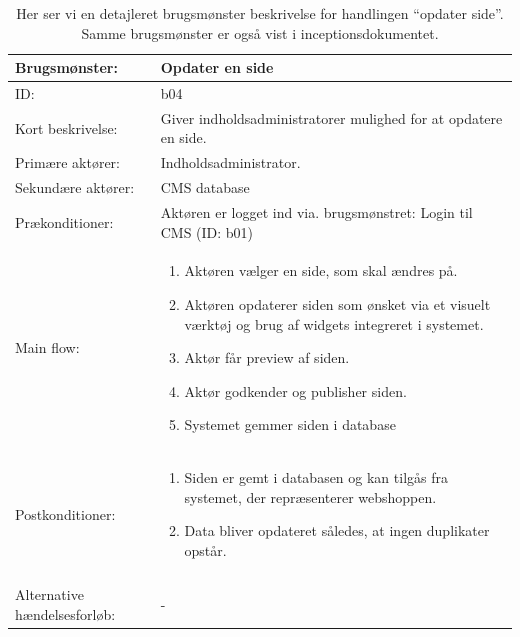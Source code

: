\begin{table}[H]
    \begin{tabular}{|p{5cm}|p{10cm}|}
        \hline
        Brugsmønster: & Opdater en side \\ 
        \hline
        ID: & b04 \\ 
        \hline
        Kort beskrivelse: & Giver indholdsadministratorer mulighed for at opdatere en side. \\ 
        \hline
        Primære aktører: & Indholdsadministrator. \\ 
        \hline
        Sekundære aktører: & CMS database \\ 
        \hline
        Prækonditioner: & Aktøren er logget ind via. brugsmønstret: Login til CMS (ID: b01) \\ 
        \hline
        Main flow: &    
        \begin{minipage}{10cm}
                \begin{enumerate}
                    \item Aktøren vælger en side, som skal ændres på.
                    \item Aktøren opdaterer siden som ønsket via et visuelt værktøj og brug af widgets integreret i systemet.
                    \item Aktør får preview af siden.
                    \item Aktør godkender og publisher siden.
                    \item Systemet gemmer siden i database
        \end{enumerate}
        \end{minipage} \par \\

        \hline
        Postkonditioner: & 
        	\begin{minipage}{10cm}
                \begin{enumerate}
                    \item Siden er gemt i databasen og kan tilgås fra systemet, der repræsenterer webshoppen.
                    \item Data bliver opdateret således, at ingen duplikater opstår.
        		\end{enumerate}
        \end{minipage} \par \\ \\ 
        \hline
        Alternative hændelsesforløb: & - \\ 
        \hline
    \end{tabular}
    \caption{Her ser vi en detajleret brugsmønster beskrivelse for handlingen “opdater side”. Samme brugsmønster er også vist i inceptionsdokumentet.}
    \label{Elab:Tabel:UC-OpdatereSide}
\end{table}


